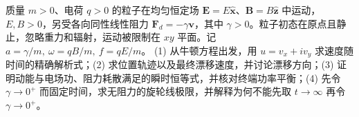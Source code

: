 质量 \(m>0\)、电荷 \(q>0\) 的粒子在均匀恒定场 \(\boldsymbol E=E\hat{\boldsymbol x}\)、\(\boldsymbol B=B\hat{\boldsymbol z}\) 中运动，\(E,B>0\)，另受各向同性线性阻力 \(\boldsymbol F_d=-\gamma\boldsymbol v\)，其中 \(\gamma>0\)。粒子初态在原点且静止，忽略重力和辐射，运动被限制在 \(xy\) 平面。记 \(a=\gamma/m,\ \omega=qB/m,\ f=qE/m\)。
(1) 从牛顿方程出发，用 \(u=v_x+i v_y\) 求速度随时间的精确解析式；(2) 求位置轨迹以及最终漂移速度，并讨论漂移方向；(3) 证明动能与电场功、阻力耗散满足的瞬时恒等式，并核对终端功率平衡；(4) 先令 \(\gamma\to0^+\) 而固定时间，求无阻力的旋轮线极限，并解释为何不能先取 \(t\to\infty\) 再令 \(\gamma\to0^+\)。

